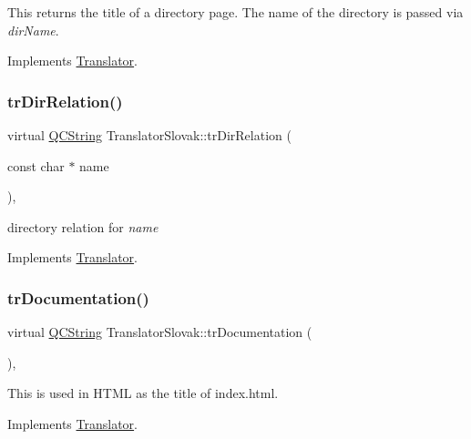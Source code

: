This returns the title of a directory page. The name of the directory is passed via {\itshape dir\+Name}. 

Implements \mbox{\hyperlink{class_translator}{Translator}}.

\mbox{\label{class_translator_slovak_a9d17d02a70e8472d18c30ed973c7fee5}} 
\subsubsection{\texorpdfstring{trDirRelation()}{trDirRelation()}}
{\footnotesize\ttfamily virtual \mbox{\hyperlink{class_q_c_string}{Q\+C\+String}} Translator\+Slovak\+::tr\+Dir\+Relation (\begin{DoxyParamCaption}\item[{const char $\ast$}]{name }\end{DoxyParamCaption})\hspace{0.3cm}{\ttfamily [inline]}, {\ttfamily [virtual]}}

directory relation for {\itshape name} 

Implements \mbox{\hyperlink{class_translator}{Translator}}.

\mbox{\label{class_translator_slovak_a3d0c3c9f19be661b08c4c3ae7160b8ff}} 
\subsubsection{\texorpdfstring{trDocumentation()}{trDocumentation()}}
{\footnotesize\ttfamily virtual \mbox{\hyperlink{class_q_c_string}{Q\+C\+String}} Translator\+Slovak\+::tr\+Documentation (\begin{DoxyParamCaption}{ }\end{DoxyParamCaption})\hspace{0.3cm}{\ttfamily [inline]}, {\ttfamily [virtual]}}

This is used in H\+T\+ML as the title of index.\+html. 

Implements \mbox{\hyperlink{class_translator}{Translator}}.

\mbox{\label{class_translator_slovak_a321841fa88551e170ad2ee1edd8bd248}} 
